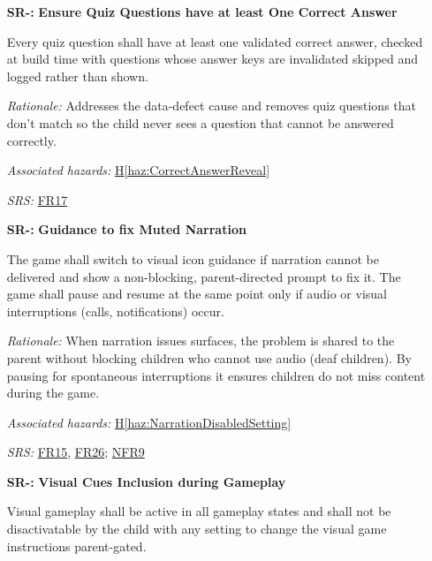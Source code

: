 \documentclass{article}
\newcounter{hazard}
\newcommand{\hazref}[1]{\hyperref[haz:#1]{H\ref*{haz:#1}}}
\newcounter{sr}
\newcommand{\srdef}[1]{\refstepcounter{sr}\label{sr:#1}\textbf{SR-\thesr:}}
\newcommand{\srsurl}{https://team-hindsight.github.io/ophthamology-game/SRS/SRS.pdf}
\newcommand{\srsfrref}[2]{\href{\srsurl\#nameddest=#1}{FR#2}}
\newcommand{\srsnfrref}[2]{\href{\srsurl\#nameddest=#1}{NFR#2}}
\begin{document}
\begin{itemize}[leftmargin=1.5cm, labelwidth=1.3cm, labelsep=0.2cm,
  align=left, itemsep=1.2em, parsep=0.6em]
\textit{Rationale:}
Prevents the child from leaving a question unsure of the answer, 
which reduces anxiety and reinforces learning in a format that supports 
learning for color-blind children and pre-readers.

\textit{Associated hazards:}
\hazref{CorrectAnswerReveal}

\textit{SRS:} \srsfrref{FR_RevealAnswer}{16}; \srsnfrref{NFR_Accessibility}{9}, \srsnfrref{NFR_Colour}{10}, \srsnfrref{NFR_Responsiveness}{12}

\item[\srdef{AtLeastOneCorrectAnswer}]
\textbf{Ensure Quiz Questions have at least One Correct Answer}

Every quiz question shall have at least one validated correct answer, 
checked at build time with questions whose answer keys are invalidated 
skipped and logged rather than shown.

\textit{Rationale:}
Addresses the data-defect cause and removes quiz questions that don't 
match so the child never sees a question that cannot be answered correctly.

\textit{Associated hazards:}
\hazref{CorrectAnswerReveal}

\textit{SRS:} \srsfrref{FR_ValidQuestions}{17}

\item[\srdef{NarrationMuted}]
\textbf{Guidance to fix Muted Narration}

The game shall switch to visual icon guidance if narration cannot be 
delivered and show a non-blocking, parent-directed prompt to fix it. 
The game shall pause and resume at the same point only if audio or 
visual interruptions (calls, notifications) occur.

\textit{Rationale:}
When narration issues surfaces, the problem is shared to the parent without 
blocking children who cannot use audio (deaf children). By pausing for 
spontaneous interruptions it ensures children do not miss content during the game.

\textit{Associated hazards:}
\hazref{NarrationDisabledSetting}

\textit{SRS:} \srsfrref{FR_NarrationFallback}{15}, \srsfrref{FR_Suspend}{26}; \srsnfrref{NFR_Accessibility}{9}

\item[\srdef{VisualCuesSetting}]
\textbf{Visual Cues Inclusion during Gameplay}

Visual gameplay shall be active in all gameplay states and shall not be 
disactivatable by the child with any setting to change the visual game 
instructions parent-gated.


\end{itemize}
\end{document}
